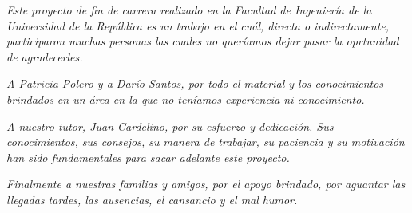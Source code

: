 \textit{Este proyecto de fin de carrera realizado en la Facultad de Ingeniería de la Universidad de la República es un trabajo en el cuál, directa o indirectamente, participaron muchas personas las cuales no queríamos dejar pasar la oprtunidad de agradecerles.}

\vspace{3 mm}

\textit{A Patricia Polero y a Darío Santos, por todo el material y los conocimientos brindados en un área en la que no teníamos experiencia ni conocimiento.}

\vspace{3 mm}

\textit{A nuestro tutor, Juan Cardelino, por su esfuerzo y dedicación. Sus conocimientos, sus consejos, su manera de trabajar, su paciencia y su motivación han sido fundamentales para sacar adelante este proyecto.}

\vspace{3 mm}

\textit{Finalmente a nuestras familias y amigos, por el apoyo brindado, por aguantar las llegadas tardes, las ausencias, el cansancio y el mal humor.}